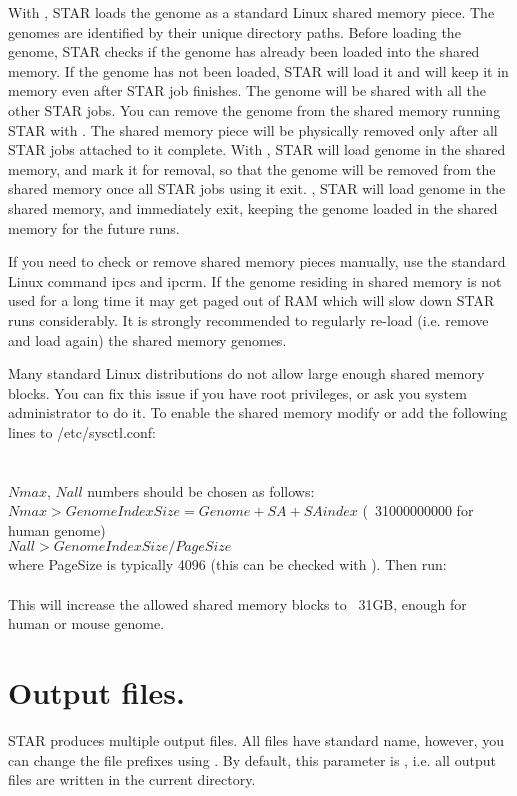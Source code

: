 \documentclass[12pt]{article}
\begin{document}
With  , STAR loads the genome as a standard Linux shared memory piece. The genomes are identified by their unique directory paths. Before loading the genome, STAR checks if the genome has already been loaded into the shared memory.  If the genome has not been loaded, STAR  will load it and will keep it in memory even after STAR job finishes. The genome will be shared with all the other STAR jobs. You can remove the genome from the shared memory running STAR with  . The shared memory piece will be physically removed only after all STAR jobs attached to it complete. With  , STAR will load genome in the shared memory, and mark it for removal, so that the genome will be removed from the shared memory once all STAR jobs using it exit.  , STAR will load genome in the shared memory, and immediately exit, keeping the genome loaded in the shared memory for the future runs.

If you need to check or remove shared memory pieces manually, use the standard Linux command ipcs and ipcrm. If the genome residing in shared memory is not used for a long time it may get paged out of RAM which will slow down STAR runs considerably. It is strongly recommended to regularly re-load (i.e. remove and load again) the shared memory genomes.

Many standard Linux distributions do not allow large enough shared memory blocks. You can fix this issue if you have root privileges, or ask you system administrator to do it. To enable the shared memory modify or add the following lines to /etc/sysctl.conf:\\
\\
\\
$Nmax$, $Nall$ numbers should be chosen as follows:\\
$Nmax > GenomeIndexSize=Genome + SA + SAindex$ (~31000000000 for human genome)\\
$Nall > GenomeIndexSize/PageSize$ \\
where PageSize is typically 4096 (this can be checked with ).
Then run:\\
\\
This will increase the allowed shared memory blocks to ~31GB, enough for human or mouse genome.

\section{Output files.}\label{Output_files}
STAR produces multiple output files. All files have standard name, however, you can change the file prefixes using  . By default, this parameter is , i.e. all output files are written in the current directory.
\end{document}
